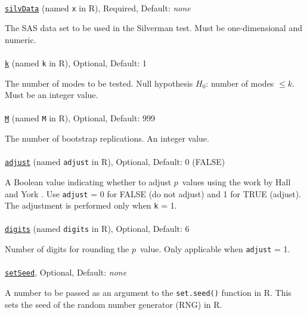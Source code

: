 \documentclass[]{interact}
\theoremstyle{plain}%
\theoremstyle{definition}
\theoremstyle{remark}
\begin{document}
\paragraph*{}
\texttt{\underline{silvData}} (named \texttt{x} in R), Required, Default: \textit{none}

The SAS data set to be used in the Silverman test. Must be one-dimensional and numeric.

\paragraph*{}
\texttt{\underline{k}} (named \texttt{k} in R), Optional, Default: 1

The number of modes to be tested. Null hypothesis $H_{0}$: number of modes $\leq k$. Must be an integer value.

\paragraph*{}
\texttt{\underline{M}} (named \texttt{M} in R), Optional, Default: 999

The number of bootstrap replications. An integer value.

\paragraph*{}
\texttt{\underline{adjust}} (named \texttt{adjust} in R), Optional, Default: 0 (FALSE)

A Boolean value indicating whether to adjust $p$~values using the work by Hall and York \cite{hall2001calibration}. Use \texttt{adjust} = 0 for FALSE (do not adjust) and 1 for TRUE (adjust). The adjustment is performed only when \texttt{k} = 1.

\paragraph*{}
\texttt{\underline{digits}} (named \texttt{digits} in R), Optional, Default: 6

Number of digits for rounding the $p$~value. Only applicable when \texttt{adjust} = 1.

\paragraph*{}
\texttt{\underline{setSeed}}, Optional, Default: \textit{none}

A number to be passed as an argument to the \texttt{set.seed()} function in R. This sets the seed of the random number generator (RNG) in R.
 
\end{document}
